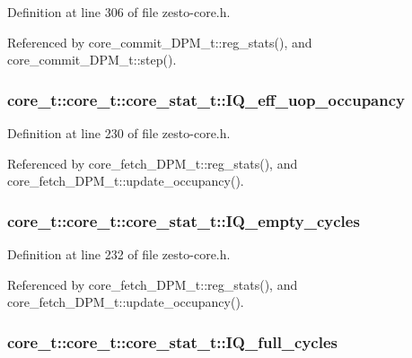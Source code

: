 Definition at line 306 of file zesto-core.h.

Referenced by core\_\-commit\_\-DPM\_\-t::reg\_\-stats(), and core\_\-commit\_\-DPM\_\-t::step().
\subsubsection[{IQ\_\-eff\_\-uop\_\-occupancy}]{ core\_\-t::core\_\-t::core\_\-stat\_\-t::IQ\_\-eff\_\-uop\_\-occupancy}\label{structcore__t_1_1core__stat__t_0c6992a01f8dbbac334a00151a2e1600}




Definition at line 230 of file zesto-core.h.

Referenced by core\_\-fetch\_\-DPM\_\-t::reg\_\-stats(), and core\_\-fetch\_\-DPM\_\-t::update\_\-occupancy().
\subsubsection[{IQ\_\-empty\_\-cycles}]{ core\_\-t::core\_\-t::core\_\-stat\_\-t::IQ\_\-empty\_\-cycles}\label{structcore__t_1_1core__stat__t_3fa0a0b9e39651f3f289f34ad5414e3b}




Definition at line 232 of file zesto-core.h.

Referenced by core\_\-fetch\_\-DPM\_\-t::reg\_\-stats(), and core\_\-fetch\_\-DPM\_\-t::update\_\-occupancy().
\subsubsection[{IQ\_\-full\_\-cycles}]{ core\_\-t::core\_\-t::core\_\-stat\_\-t::IQ\_\-full\_\-cycles}\label{structcore__t_1_1core__stat__t_db41417f9f79332f2339b9789bf12e0f}




